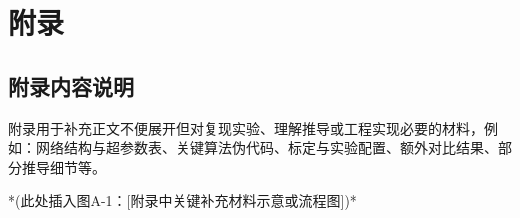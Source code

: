 \chapter{附录}

\section{附录内容说明}
附录用于补充正文不便展开但对复现实验、理解推导或工程实现必要的材料，例如：网络结构与超参数表、关键算法伪代码、标定与实验配置、额外对比结果、部分推导细节等。

*(此处插入图A-1：[附录中关键补充材料示意或流程图])*

